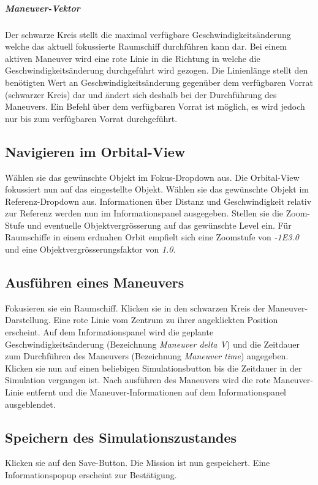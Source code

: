 \subparagraph{Maneuver-Vektor}
Der schwarze Kreis stellt die maximal verfügbare Geschwindigkeitsänderung welche das aktuell fokussierte Raumschiff durchführen kann dar. Bei einem aktiven Maneuver wird eine rote Linie in die Richtung in welche die Geschwindigkeitsänderung durchgeführt wird gezogen. Die Linienlänge stellt den benötigten Wert an Geschwindigkeitsänderung gegenüber dem verfügbaren Vorrat (schwarzer Kreis) dar und ändert sich deshalb bei der Durchführung des Maneuvers. Ein Befehl über dem verfügbaren Vorrat ist möglich, es wird jedoch nur bis zum verfügbaren Vorrat durchgeführt.

\subsection{Navigieren im Orbital-View}
Wählen sie das gewünschte Objekt im Fokus-Dropdown aus.
Die Orbital-View fokussiert nun auf das eingestellte Objekt.
Wählen sie das gewünschte Objekt im Referenz-Dropdown aus.
Informationen über Distanz und Geschwindigkeit relativ zur Referenz werden nun im Informationspanel ausgegeben.
Stellen sie die Zoom-Stufe und eventuelle Objektvergrösserung auf das gewünschte Level ein.
Für Raumschiffe in einem erdnahen Orbit empfielt sich eine Zoomstufe von \emph{-1E3.0} und eine Objektvergrösserungsfaktor von \emph{1.0}.

\subsection{Ausführen eines Maneuvers}
Fokusieren sie ein Raumschiff.
Klicken sie in den schwarzen Kreis der Maneuver-Darstellung.
Eine rote Linie vom Zentrum zu ihrer angeklickten Position erscheint.
Auf dem Informationspanel wird die geplante Geschwindigkeitsänderung (Bezeichnung \emph{Maneuver delta V}) und die Zeitdauer zum Durchführen des Maneuvers (Bezeichnung \emph{Maneuver time}) angegeben.\\
Klicken sie nun auf einen beliebigen Simulationsbutton bis die Zeitdauer in der Simulation vergangen ist.
Nach ausführen des Maneuvers wird die rote Maneuver-Linie entfernt und die Maneuver-Informationen auf dem Informationspanel ausgeblendet.

\subsection{Speichern des Simulationszustandes}
Klicken sie auf den Save-Button. 
Die Mission ist nun gespeichert. 
Eine Informationspopup erscheint zur Bestätigung.

 